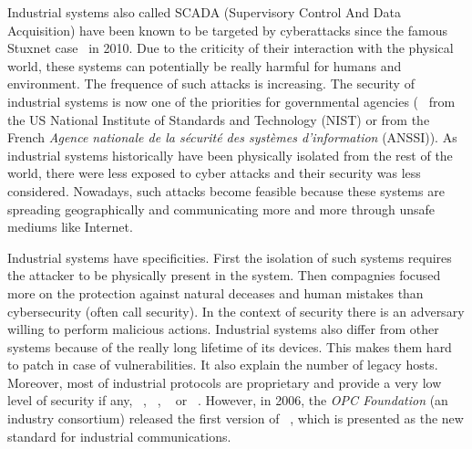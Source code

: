 
Industrial systems also called SCADA (Supervisory Control And Data
Acquisition) have been known to be targeted by cyberattacks since the
famous Stuxnet case~\cite{Lan11} in 2010.  Due to the criticity of
their interaction with the physical world, these systems can
potentially be really harmful for humans and environment.  The
frequence of such attacks is increasing.  The security of industrial
systems is now one of the priorities for governmental agencies
(\eg~\cite{SFS11} from the US National Institute of Standards and
Technology (NIST) or
\cite{ANSSI12_guide_securite_industrielle_en} from the French {\em Agence
nationale de la sécurité des systèmes d'information} (ANSSI)).  As
industrial systems historically have been physically isolated from the
rest of the world, there were less exposed to cyber attacks and their
security was less considered. Nowadays, such attacks become feasible
because these systems are spreading geographically and communicating
more and more through unsafe mediums like Internet.


Industrial systems have specificities. First the isolation of such
systems requires the attacker to be physically present in the
system. Then compagnies focused more on the protection against natural
deceases and human mistakes than cybersecurity (often call security).
In the context of security there is an adversary willing to perform malicious
actions.  Industrial systems also differ from other systems because of
the really long lifetime of its devices.  This makes them hard to
patch in case of vulnerabilities. It also explain the number of legacy
hosts. Moreover, most of industrial protocols are proprietary and
provide a very low level of security if
any, \eg \modbus~\cite{MODBUS}, \profinet~\cite{PROFINET}, \etherip~\cite{Bro01}
or
\dnp~\cite{CR04}.
However, in 2006, the {\em OPC Foundation} (an industry consortium)
released the first version of \opcua~\cite{MLD09}, which is presented
as the new standard for industrial communications. %

